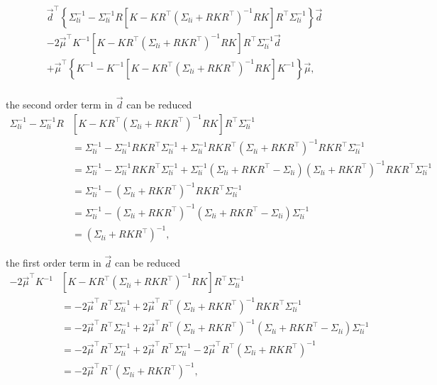 \begin{multline*}
\vec{d}^{\top} \left\{ \Sigma_{li}^{-1} - \Sigma_{li}^{-1} R \left[K - K R^{\top} \left(\Sigma_{li} + RK R^{\top}\right)^{-1} R K \right] R^{\top} \Sigma_{li}^{-1} \right\} \vec{d} \\- 2 \vec{\mu}^{\top} K^{-1} \left[K - K R^{\top} \left(\Sigma_{li} + RK R^{\top}\right)^{-1} R K \right] R^{\top} \Sigma_{li}^{-1} \vec{d} \\+ \vec{\mu}^{\top} \left\{ K^{-1} - K^{-1}\left[K - K R^{\top} \left(\Sigma_{li} + RK R^{\top}\right)^{-1} R K \right] K^{-1} \right\}\vec{\mu},\\
\end{multline*}

the second order term in $\vec d$ can be reduced
$$
\begin{aligned}
\Sigma_{li}^{-1} - \Sigma_{li}^{-1} R &\left[K - K R^{\top} \left(\Sigma_{li} + RK R^{\top}\right)^{-1} R K \right] R^{\top} \Sigma_{li}^{-1} \\ &= \Sigma_{li}^{-1} - \Sigma_{li}^{-1} R K R^{\top} \Sigma_{li}^{-1} + \Sigma_{li}^{-1} R K R^{\top} \left(\Sigma_{li} + RK R^{\top}\right)^{-1} R K R^{\top} \Sigma_{li}^{-1}\\ &= \Sigma_{li}^{-1} - \Sigma_{li}^{-1} R K R^{\top} \Sigma_{li}^{-1} + \Sigma_{li}^{-1} \left(\Sigma_{li} + R K R^{\top} - \Sigma_{li}\right)\left(\Sigma_{li} + RK R^{\top}\right)^{-1} R K R^{\top} \Sigma_{li}^{-1} \\
&= \Sigma_{li}^{-1} - \left(\Sigma_{li} + RK R^{\top}\right)^{-1} R K R^{\top} \Sigma_{li}^{-1} \\ &= \Sigma_{li}^{-1} - \left(\Sigma_{li} + RK R^{\top}\right)^{-1} \left(\Sigma_{li} + R K R^{\top} - \Sigma_{li} \right)\Sigma_{li}^{-1} \\ &= \left(\Sigma_{li} + RK R^{\top}\right)^{-1},
\end{aligned}
$$

the first order term in $\vec d$ can be reduced
$$
\begin{aligned}
-2 \vec{\mu}^{\top} K^{-1} &\left[K - K R^{\top} \left(\Sigma_{li} + RK R^{\top}\right)^{-1} R K \right] R^{\top} \Sigma_{li}^{-1} \\
&= -2 \vec{\mu}^{\top} R^{\top} \Sigma_{li}^{-1} + 2 \vec{\mu}^{\top} R^{\top} \left(\Sigma_{li} + RK R^{\top}\right)^{-1} R K R^{\top} \Sigma_{li}^{-1}\\
&= -2 \vec{\mu}^{\top} R^{\top} \Sigma_{li}^{-1} + 2 \vec{\mu}^{\top} R^{\top} \left(\Sigma_{li} + RK R^{\top}\right)^{-1} \left( \Sigma_{li} + R K R^{\top} - \Sigma_{li} \right) \Sigma_{li}^{-1} \\
&= -2 \vec{\mu}^{\top} R^{\top} \Sigma_{li}^{-1} + 2 \vec{\mu}^{\top} R^{\top} \Sigma_{li}^{-1} - 2 \vec{\mu}^{\top} R^{\top} \left(\Sigma_{li} + RK R^{\top}\right)^{-1} \\
&= -2 \vec{\mu}^{\top} R^{\top} \left(\Sigma_{li} + RK R^{\top}\right)^{-1},
\end{aligned}
$$

